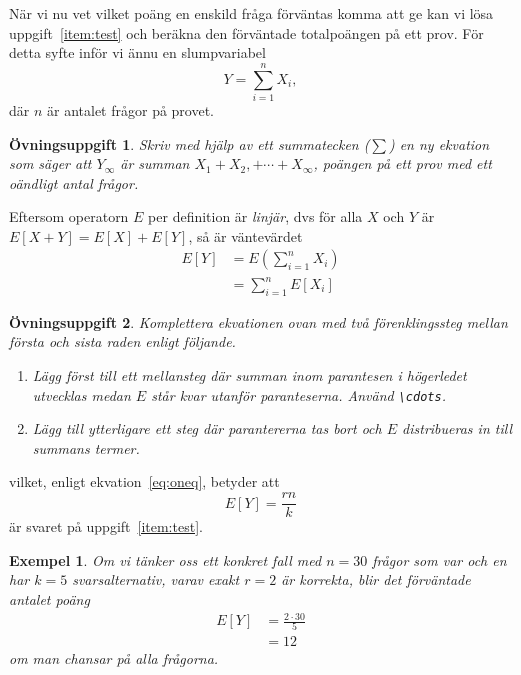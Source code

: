 \documentclass[12pt,a4wide]{article}
\newtheorem{exempel}{Exempel} %
\theoremstyle{uppgiftsstil}
\newcommand{\ovningstext}{Övningsuppgift}
\newtheorem{ovning}{\ovningstext}
\newenvironment{uppgift}{\begin{framed}\begin{ovning}}%
                        {\end{ovning}\end{framed}}
\theoremstyle{avklaradstil}
\begin{document}
När vi nu vet vilket poäng en enskild fråga förväntas komma att ge kan
vi lösa uppgift~\ref{item:test} och beräkna den förväntade
totalpoängen på ett prov. För detta syfte inför vi ännu en
slumpvariabel 
\begin{equation*}
  Y=\sum_{i=1}^n X_i,
\end{equation*}
där $n$ är antalet frågor på provet. 
\begin{uppgift}
  Skriv med hjälp av ett summatecken ($\sum$) en ny ekvation som säger
  att $Y_{\infty}$ är summan $X_1+X_2,+\cdots+X_\infty$, poängen på
  ett prov med ett oändligt antal frågor. 
\end{uppgift}
Eftersom operatorn $E$ per definition är \emph{linjär}, dvs för alla
$X$ och $Y$ är $E[X+Y]=E[X]+E[Y]$, så är väntevärdet 
\begin{align*}  %
  E[Y]    &= E\left(\sum_{i=1}^n X_i\right) \\
            &= \sum_{i=1}^n E[X_i]
\end{align*}
\begin{uppgift}
  Komplettera ekvationen ovan med två förenklingssteg mellan första
  och sista raden enligt följande.
  \begin{enumerate}
    \item Lägg först till ett mellansteg där summan inom parantesen i
      högerledet utvecklas medan $E$ står kvar utanför
      paranteserna. Använd \verb|\cdots|. 
    \item Lägg till ytterligare ett steg där parantererna tas bort och
      $E$ distribueras in till summans termer.  
  \end{enumerate}
\end{uppgift}
vilket, enligt ekvation~\ref{eq:oneq}, betyder att 
\begin{equation*}                              %
  E[Y] = \boxed{\frac{rn}{k}} \label{eq:total} %
\end{equation*}
är svaret på uppgift~\ref{item:test}. %

\begin{exempel}  %
  Om vi tänker oss ett konkret fall med $n=30$ frågor som var och en
  har $k=5$ svarsalternativ, varav exakt $r=2$ är korrekta, blir det
  förväntade antalet poäng
  \begin{align*}
    E[Y] &= \frac{2\cdot 30}{5} \\ %
    &= 12
  \end{align*}
  om man chansar på alla frågorna.
\end{exempel}
\end{document}
